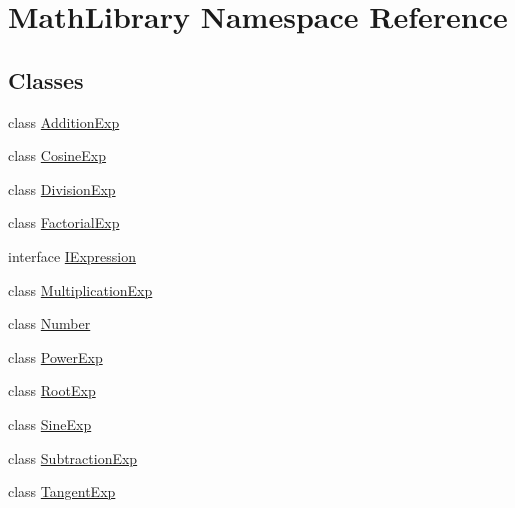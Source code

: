 \hypertarget{namespace_math_library}{}\section{Math\+Library Namespace Reference}
\label{namespace_math_library}
\subsection*{Classes}
\begin{DoxyCompactItemize}
\item 
class \mbox{\hyperlink{class_math_library_1_1_addition_exp}{Addition\+Exp}}
\item 
class \mbox{\hyperlink{class_math_library_1_1_cosine_exp}{Cosine\+Exp}}
\item 
class \mbox{\hyperlink{class_math_library_1_1_division_exp}{Division\+Exp}}
\item 
class \mbox{\hyperlink{class_math_library_1_1_factorial_exp}{Factorial\+Exp}}
\item 
interface \mbox{\hyperlink{interface_math_library_1_1_i_expression}{I\+Expression}}
\item 
class \mbox{\hyperlink{class_math_library_1_1_multiplication_exp}{Multiplication\+Exp}}
\item 
class \mbox{\hyperlink{class_math_library_1_1_number}{Number}}
\item 
class \mbox{\hyperlink{class_math_library_1_1_power_exp}{Power\+Exp}}
\item 
class \mbox{\hyperlink{class_math_library_1_1_root_exp}{Root\+Exp}}
\item 
class \mbox{\hyperlink{class_math_library_1_1_sine_exp}{Sine\+Exp}}
\item 
class \mbox{\hyperlink{class_math_library_1_1_subtraction_exp}{Subtraction\+Exp}}
\item 
class \mbox{\hyperlink{class_math_library_1_1_tangent_exp}{Tangent\+Exp}}
\end{DoxyCompactItemize}
